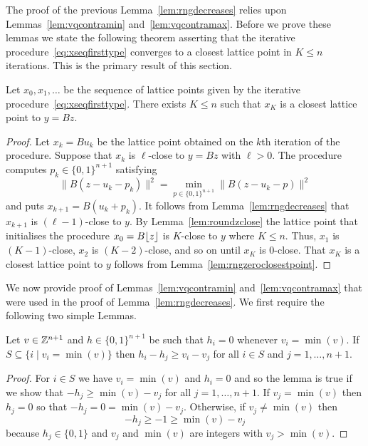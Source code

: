 \documentclass[final,leqno]{siamltex}
\begin{document}
The proof of the previous Lemma~\ref{lem:rngdecreases} relies upon Lemmas~\ref{lem:vqcontramin} and~\ref{lem:vqcontramax}.  Before we prove these lemmas we state the following theorem asserting that the iterative procedure~\eqref{eq:xseqfirsttype} converges to a closest lattice point in $K \leq n$ iterations.  This is the primary result of this section.

\begin{theorem}
Let $x_0,x_1,\dots$ be the sequence of lattice points given by the iterative procedure~\eqref{eq:xseqfirsttype}.  There exists $K \leq n$ such that $x_K$ is a closest lattice point to $y = Bz$.
\end{theorem}
\begin{proof}
Let $x_k = B u_k$ be the lattice point obtained on the $k$th iteration of the procedure.  Suppose that $x_k$ is $\ell$-close to $y=Bz$ with $\ell > 0$.  The procedure computes $p_{k} \in \{0,1\}^{n+1}$ satisfying
\[
\|B(z - u_k - p_{k})\|^2 = \min_{p \in \{0,1\}^{n+1}}\|B(z - u_k - p)\|^2
\]
and puts $x_{k+1} = B(u_k + p_k)$.  It follows from Lemma~\ref{lem:rngdecreases} that $x_{k+1}$ is $(\ell-1)$-close to $y$.  By Lemma~\ref{lem:roundzclose} the lattice point that initialises the procedure $x_0 = B {\left\lfloor z \right\rfloor}$ is $K$-close to $y$ where $K \leq n$.  Thus, $x_1$ is $(K-1)$-close, $x_2$ is $(K-2)$-close, and so on until $x_K$ is $0$-close.  That $x_K$ is a closest lattice point to $y$ follows from Lemma~\ref{lem:rngzeroclosestpoint}.
\end{proof}

We now provide proof of Lemmas~\ref{lem:vqcontramin} and~\ref{lem:vqcontramax} that were used in the proof of Lemma~\ref{lem:rngdecreases}.  We first require the following two simple Lemmas.

\begin{lemma}\label{lem:simplevminh}
Let $v \in {\mathbb Z}^{n+1}$ and $h \in \{0,1\}^{n+1}$ be such that $h_i = 0$ whenever $v_i = \min(v)$.  If $S \subseteq \{ i \mid v_i = \min(v) \}$ then $h_i - h_j \geq v_i - v_j$ for all $i \in S$ and $j = 1,\dots,n+1$.
\end{lemma}
\begin{proof}
For $i \in S$ we have $v_i = \min(v)$ and $h_i = 0$ and so the lemma is true if we show that $-h_j \geq \min(v) - v_j$ for all $j=1,\dots,n+1$.  If $v_j = \min(v)$ then $h_j = 0$ so that $-h_j = 0 = \min(v) - v_j$.  Otherwise, if $v_j \neq \min(v)$ then 
\[
-h_j \geq -1 \geq \min(v) - v_j
\] 
because $h_j \in \{0,1\}$ and $v_j$ and $\min(v)$ are integers with $v_j > \min(v)$.
\end{proof}
\end{document}
